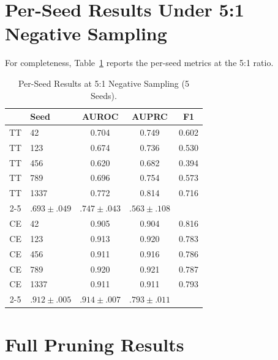 \documentclass[journal]{IEEEtran}
\begin{document}
\section{Per-Seed Results Under 5:1 Negative Sampling}
\label{app:5to1_seeds}

For completeness, Table~\ref{tab:perseed_5to1} reports the per-seed metrics at
the 5:1 ratio.

\begin{table}[!t]
  \caption{Per-Seed Results at 5:1 Negative Sampling (5 Seeds).}
  \label{tab:perseed_5to1}
  \centering
  \footnotesize
  \begin{tabular}{@{}clccc@{}}
    \hline
    & Seed & AUROC & AUPRC & F1 \\
    \hline
    TT & 42   & 0.704 & 0.749 & 0.602 \\
    TT & 123  & 0.674 & 0.736 & 0.530 \\
    TT & 456  & 0.620 & 0.682 & 0.394 \\
    TT & 789  & 0.696 & 0.754 & 0.573 \\
    TT & 1337 & 0.772 & 0.814 & 0.716 \\
    \cline{2-5}
    \multicolumn{2}{@{}l}{TT $\mu{\pm}\sigma$}
      & $.693{\pm}.049$ & $.747{\pm}.043$ & $.563{\pm}.108$ \\
    \hline
    CE & 42   & 0.905 & 0.904 & 0.816 \\
    CE & 123  & 0.913 & 0.920 & 0.783 \\
    CE & 456  & 0.911 & 0.916 & 0.786 \\
    CE & 789  & 0.920 & 0.921 & 0.787 \\
    CE & 1337 & 0.911 & 0.911 & 0.793 \\
    \cline{2-5}
    \multicolumn{2}{@{}l}{CE $\mu{\pm}\sigma$}
      & $.912{\pm}.005$ & $.914{\pm}.007$ & $.793{\pm}.011$ \\
    \hline
  \end{tabular}
\end{table}

\section{Full Pruning Results}
\label{app:pruning_full}
\end{document}
